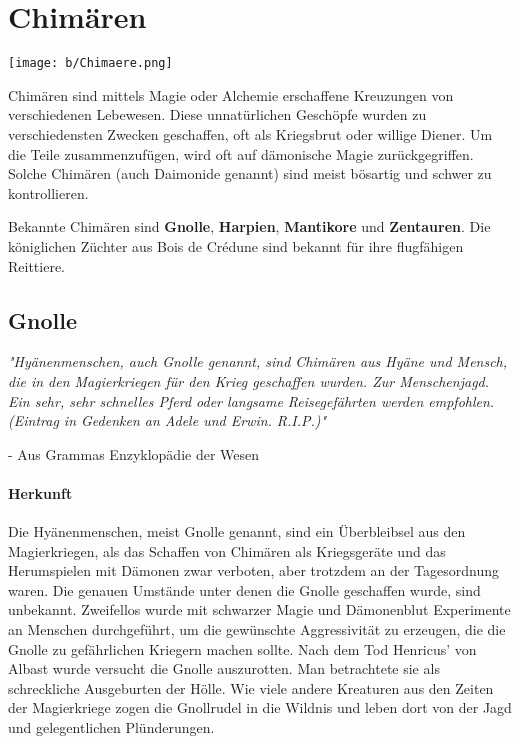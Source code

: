 \documentclass[10pt,twoside,twocolumn,openany]{book}
\begin{document}
\section{Chimären}
\begin{multicols}{2}
	\texttt{[image: b/Chimaere.png]}
	
	Chimären sind mittels Magie oder Alchemie erschaffene Kreuzungen von verschiedenen Lebewesen. Diese unnatürlichen Geschöpfe wurden zu verschiedensten Zwecken geschaffen, oft als Kriegsbrut oder willige Diener. Um die Teile zusammenzufügen, wird oft auf dämonische Magie zurückgegriffen. Solche Chimären (auch Daimonide genannt) sind meist bösartig und schwer zu kontrollieren.
	
	Bekannte Chimären sind \textbf{Gnolle}, \textbf{Harpien}, \textbf{Mantikore} und \textbf{Zentauren}. Die königlichen Züchter aus Bois de Crédune sind bekannt für ihre flugfähigen Reittiere.
	
	\subsection{Gnolle}
	\textit{"Hyänenmenschen, auch Gnolle genannt, sind Chimären aus Hyäne und Mensch, die in den Magierkriegen für den Krieg geschaffen wurden. Zur Menschenjagd. Ein sehr, sehr schnelles Pferd oder langsame Reisegefährten werden empfohlen. \\ (Eintrag in Gedenken an Adele und Erwin. R.I.P.)"}
	\begin{flushright}
		- Aus Grammas Enzyklopädie der Wesen
		\end{flushright}
		
		\paragraph{Herkunft}
		Die Hyänenmenschen, meist Gnolle genannt, sind ein Überbleibsel aus den Magierkriegen, als das Schaffen von Chimären als Kriegsgeräte und das Herumspielen mit Dämonen zwar verboten, aber trotzdem an der Tagesordnung waren.
		Die genauen Umstände unter denen die Gnolle geschaffen wurde, sind unbekannt. Zweifellos wurde mit schwarzer Magie und Dämonenblut Experimente an  Menschen durchgeführt, um die gewünschte Aggressivität zu erzeugen, die die Gnolle zu gefährlichen Kriegern machen sollte.
		Nach dem Tod Henricus' von Albast wurde versucht die Gnolle auszurotten. Man betrachtete sie als schreckliche Ausgeburten der Hölle. Wie  viele andere Kreaturen aus den Zeiten der Magierkriege zogen die Gnollrudel in die Wildnis und leben dort von der Jagd und gelegentlichen Plünderungen.
		

\end{multicols}
\end{document}
